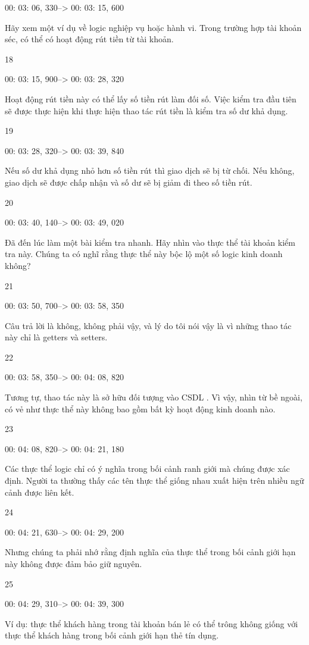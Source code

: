 00: 03: 06, 330--> 00: 03: 15, 600

Hãy xem một ví dụ về logic nghiệp vụ hoặc hành vi. Trong trường hợp tài khoản séc, có thể có hoạt động rút tiền từ tài khoản.

18

00: 03: 15, 900--> 00: 03: 28, 320

Hoạt động rút tiền này có thể lấy số tiền rút làm đối số. Việc kiểm tra đầu tiên sẽ được thực hiện khi thực hiện thao tác rút tiền là kiểm tra số dư khả dụng.

19

00: 03: 28, 320--> 00: 03: 39, 840

Nếu số dư khả dụng nhỏ hơn số tiền rút thì giao dịch sẽ bị từ chối. Nếu không, giao dịch sẽ được chấp nhận và số dư sẽ bị giảm đi theo số tiền rút.

20

00: 03: 40, 140--> 00: 03: 49, 020

Đã đến lúc làm một bài kiểm tra nhanh. Hãy nhìn vào thực thể tài khoản kiểm tra này. Chúng ta có nghĩ rằng thực thể này bộc lộ một số logic kinh doanh không?

21

00: 03: 50, 700--> 00: 03: 58, 350

Câu trả lời là không, không phải vậy, và lý do tôi nói vậy là vì những thao tác này chỉ là getters và setters.

22

00: 03: 58, 350--> 00: 04: 08, 820

Tương tự, thao tác này là sở hữu đối tượng vào CSDL . Vì vậy, nhìn từ bề ngoài, có vẻ như thực thể này không bao gồm bất kỳ hoạt động kinh doanh nào.

23

00: 04: 08, 820--> 00: 04: 21, 180

Các thực thể logic chỉ có ý nghĩa trong bối cảnh ranh giới mà chúng được xác định. Người ta thường thấy các tên thực thể giống nhau xuất hiện trên nhiều ngữ cảnh được liên kết.

24

00: 04: 21, 630--> 00: 04: 29, 200

Nhưng chúng ta phải nhớ rằng định nghĩa của thực thể trong bối cảnh giới hạn này không được đảm bảo giữ nguyên.

25

00: 04: 29, 310--> 00: 04: 39, 300

Ví dụ: thực thể khách hàng trong tài khoản bán lẻ có thể trông không giống với thực thể khách hàng trong bối cảnh giới hạn thẻ tín dụng.

